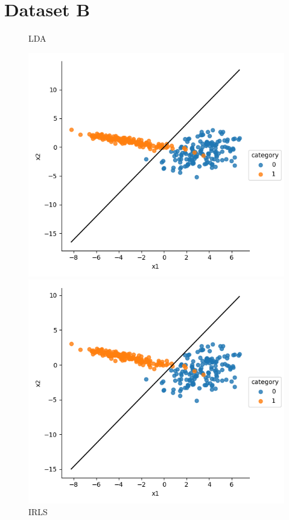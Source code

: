 \documentclass[a4paper]{article}
\begin{document}
\section{Dataset B}
\begin{figure}[h]
\centering
\begin{minipage}{0,45\textwidth}
\caption{LDA}
\includegraphics[scale=.5]{b_lda.png}
\end{minipage}
\begin{minipage}{0,45\textwidth}
\caption{IRLS}
\includegraphics[scale=.5]{b_irls.png}

\end{minipage}
\end{figure}
\end{document}
